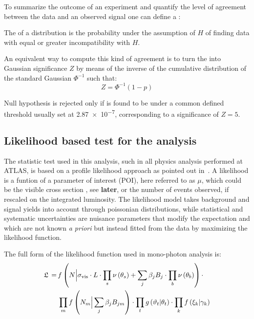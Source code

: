 To summarize the outcome of an experiment and quantify the level of agreement between the data and an observed signal one can define a \p:
\begin{definizione}
  The \p of a distribution is the probability under the assumption of $H$ of finding data with equal or greater incompatibility with $H$.
\end{definizione}

An equivalent way to compute this kind of agreement is to turn the \p into Gaussian significance $Z$ by means of the inverse of the cumulative distribution of the standard Gaussian $\Phi^{-1}$ such that:
\begin{equation}
  Z = \Phi^{-1}(1-p)
\end{equation}

Null hypothesis is rejected only if \p is found to be under a common defined threshold usually set at \num{2.87e-7}, corresponding to a significance of $Z=5$.

\subsection{Likelihood based test for the \mph analysis}
The statistic test used in this analysis, such in all physics analysis performed at ATLAS, is based on a profile likelihood approach as pointed out in~\cite{mgiulia}. A likelihood is a funtion of a parameter of interest (POI), here referred to as $\mu$, which could be the visible cross section \sv, see \textbf{later}, or the number of events observed, if rescaled on the integrated luminosity.
The likelihood model takes background and signal yields into account through poissonian distributions, while statistical and systematic uncertainties are nuisance parameters that modify the expectation and which are not known {\itshape a priori} but instead fitted from the data by maximizing the likelihood function.

The full form of the likelihood function used in mono-photon analysis is: 
\begin{equation}
  \label{eqn:likelihood}
  \begin{split}
    \mathfrak{L} \,=\, &  f\left( N \Big\vert \sigma_{\textup{vis}} \cdot L \cdot \prod_s \nu\left(\theta_{s}\right) +\sum _j \beta_{j} B_{j}\cdot \prod_b \nu\left(\theta_{b}\right)\right) \cdot \\
    & \prod_m f\left(N_{m} \Big\vert \sum _j \beta_{j} B_{jm}\right) \cdot \prod _t g\left(\vartheta_{t} \vert \theta_{t}\right) \cdot \prod _k f\left(\xi_{k} \vert \gamma_{k}\right)
  \end{split}
\end{equation}

